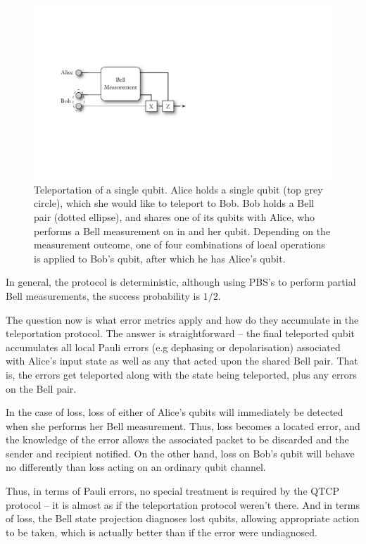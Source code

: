 \documentclass[aps,rmp,twocolumn,amsmath,amssymb,nofootinbib,superscriptaddress]{revtex4}
\begin{document}
\begin{figure}[!htb]
\includegraphics[width=0.9\columnwidth]{teleportation}
\caption{Teleportation of a single qubit. Alice holds a single qubit (top grey circle), which she would like to teleport to Bob. Bob holds a Bell pair (dotted ellipse), and shares one of its qubits with Alice, who performs a Bell measurement on in and her qubit. Depending on the measurement outcome, one of four combinations of local operations is applied to Bob's qubit, after which he has Alice's qubit.} \label{fig:teleport}
\end{figure}

In general, the protocol is deterministic, although using PBS's to perform partial Bell measurements, the success probability is $1/2$.

The question now is what error metrics apply and how do they accumulate in the teleportation protocol. The answer is straightforward -- the final teleported qubit accumulates all local Pauli errors (e.g dephasing or depolarisation) associated with Alice's input state as well as any that acted upon the shared Bell pair. That is, the errors get teleported along with the state being teleported, plus any errors on the Bell pair.

In the case of loss, loss of either of Alice's qubits will immediately be detected when she performs her Bell measurement. Thus, loss becomes a located error, and the knowledge of the error allows the associated packet to be discarded and the sender and recipient notified. On the other hand, loss on Bob's qubit will behave no differently than loss acting on an ordinary qubit channel.

Thus, in terms of Pauli errors, no special treatment is required by the QTCP protocol -- it is almost as if the teleportation protocol weren't there. And in terms of loss, the Bell state projection diagnoses lost qubits, allowing appropriate action to be taken, which is actually better than if the error were undiagnosed.
\end{document}
